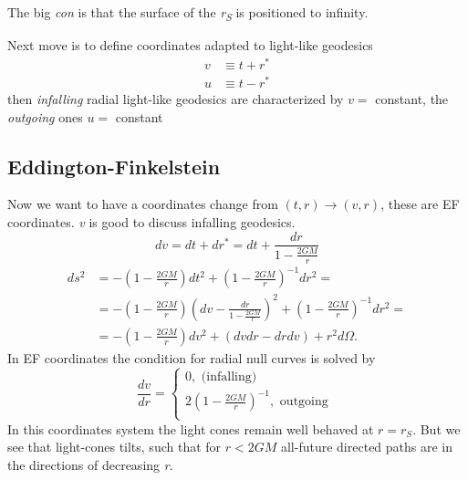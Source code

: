 \bigskip
The big \emph{con } is that the surface of the \emph{r\textsubscript{S}} is positioned to infinity.\par
Next move is to define coordinates adapted to light-like geodesics
\begin{align}
	v & \equiv t+ r^{*}\\
	u & \equiv t - r^{*} 
\end{align}
then \emph{infalling} radial light-like geodesics are characterized by $v =$ constant, the \emph{outgoing} ones $u=$ constant


\subsection{Eddington-Finkelstein}
Now we want to have a coordinates change from $\left( t,r \right) \to \left( v,r \right)$, these are EF coordinates. \emph{v} is good to discuss infalling geodesics.
\[
dv = dt + dr^{*} = dt + \frac{dr}{1- \frac{2GM}{r}}
\]
\begin{align}
	ds^{2} &= - \left( 1 - \frac{2GM}{r} \right)dt^{2} + \left( 1- \frac{2GM}{r} \right)^{-1}dr^{2} = \\
	       & = - \left( 1- \frac{2GM}{r} \right) \left( dv - \frac{dr}{1 - \frac{2GM}{r}} \right)^{2} + \left( 1 - \frac{2GM}{r} \right)^{-1} dr^{2} = \\
	       & = - \left( 1 - \frac{2GM}{r} \right)dv^{2} + \left( dvdr-drdv \right) + r^{2}d\Omega .
\end{align}
In EF coordinates the condition for radial null curves is solved by
\begin{equation}
\frac{d v}{d r} = \begin{cases}
0,   \text{ (infalling) }\\
2 \left( 1 - \frac{2GM}{r} \right)^{-1} , \text{ outgoing }\\
\end{cases}
\end{equation}
In this coordinates system the light cones remain well behaved at $r=r_{S}$. But we see that light-cones tilts, such that for $r<2GM$ all-future directed paths are in the directions of decreasing \emph{r}.\par
\bigskip

